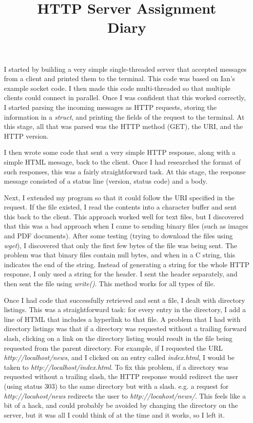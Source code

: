 \documentclass[a4paper]{article}
\title{HTTP Server Assignment \\
  \large Diary}
\date{}
\author{}
\begin{document}
\maketitle

I started by building a very simple single-threaded server that accepted
messages from a client and printed them to the terminal. This code was based on
Ian's example socket code. I then made this code multi-threaded so that multiple
clients could connect in parallel. Once I was confident that this worked
correctly, I started parsing the incoming messages as HTTP requests, storing
the information in a {\it struct}, and printing the fields of the request to the
terminal. At this stage, all that was parsed was the HTTP method (GET), the URI,
and the HTTP version.

I then wrote some code that sent a very simple HTTP response, along with a
simple HTML message, back to the client. Once I had researched the format of
such responses, this was a fairly straightforward task. At this stage, the
response message consisted of a status line (version, status code) and a body.

Next, I extended my program so that it could follow the URI specified in the
request. If the file existed, I read the contents into a character buffer and
sent this back to the client. This approach worked well for text files, but I
discovered that this was a bad approach when I came to sending binary files
(such as images and PDF documents). After some testing (trying to download the
files using {\it wget}), I discovered that only the first few bytes of the file
was being sent. The problem was that binary files contain null bytes, and when
in a C string, this indicates the end of the string. Instead of generating a
string for the whole HTTP response, I only used a string for the header. I sent
the header separately, and then sent the file using {\it write()}. This method
works for all types of file.

Once I had code that successfully retrieved and sent a file, I dealt with
directory listings. This was a straightforward task: for every entry in the
directory, I add a line of HTML that includes a hyperlink to that file. A
problem that I had with directory listings was that if a directory was requested
without a trailing forward slash, clicking on a link on the directory listing
would result in the file being requested from the parent directory. For example,
if I requested the URL {\it http://localhost/news}, and I clicked on an entry
called {\it index.html}, I would be taken to {\it http://localhost/index.html}.
To fix this problem, if a directory was requested without a trailing slash, the
HTTP response would redirect the user (using status 303) to the same directory
but with a slash. e.g. a request for {\it http://locahost/news} redirects the
user to {\it http://locahost/news/}. This feels like a bit of a hack, and could
probably be avoided by changing the directory on the server, but it was all I
could think of at the time and it works, so I left it.
\end{document}
